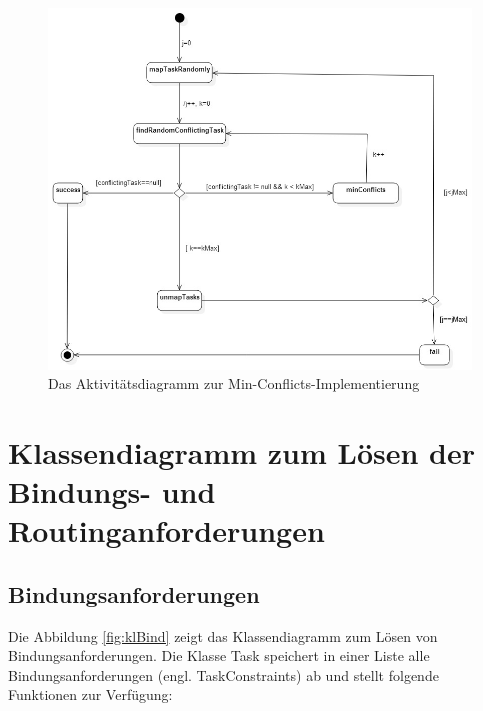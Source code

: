 \begin{figure}[H]\centering
  \includegraphics[width = 150mm]{bilder/minAkti.jpg}
  \caption{Das Aktivitätsdiagramm zur Min-Conflicts-Implementierung}\label{fig:minConflictsAkti}
\end{figure}
\section{Klassendiagramm zum Lösen der Bindungs- und Routinganforderungen}


\subsection{Bindungsanforderungen}

Die Abbildung \ref{fig:klBind} zeigt das Klassendiagramm zum Lösen von Bindungsanforderungen. Die Klasse Task speichert in einer Liste alle Bindungsanforderungen (engl. TaskConstraints) ab und stellt folgende Funktionen zur Verfügung:

